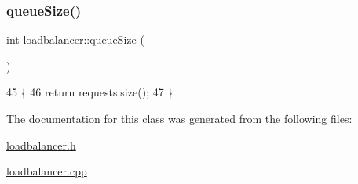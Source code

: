 \subsubsection{\texorpdfstring{queue\+Size()}{queueSize()}}
{\footnotesize\ttfamily int loadbalancer\+::queue\+Size (\begin{DoxyParamCaption}{ }\end{DoxyParamCaption})}


\begin{DoxyCode}
45                             \{
46     \textcolor{keywordflow}{return} requests.size();
47 \}
\end{DoxyCode}


The documentation for this class was generated from the following files\+:\begin{DoxyCompactItemize}
\item 
\hyperlink{loadbalancer_8h}{loadbalancer.\+h}\item 
\hyperlink{loadbalancer_8cpp}{loadbalancer.\+cpp}\end{DoxyCompactItemize}
